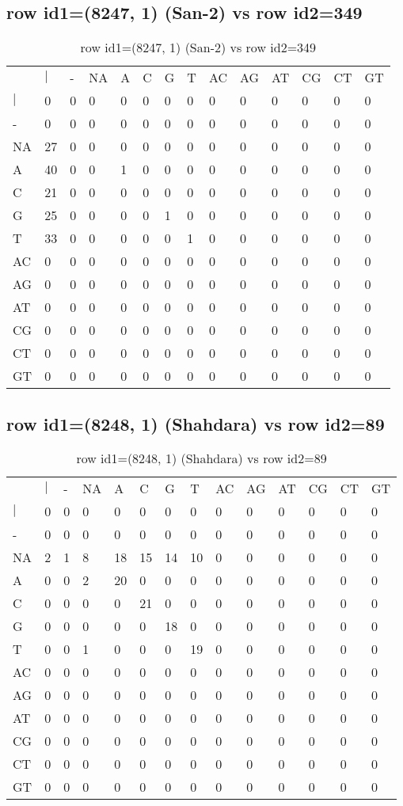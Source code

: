 \subsection{row id1=(8247, 1) (San-2) vs row id2=349}
\begin{center}
\begin{longtable}{|l|l|l|l|l|l|l|l|l|l|l|l|l|l|}
\caption{row id1=(8247, 1) (San-2) vs row id2=349} \label{table_dm190}\\
\hline
\\
\hline
&$|$&-&NA&A&C&G&T&AC&AG&AT&CG&CT&GT\\
$|$&0&0&0&0&0&0&0&0&0&0&0&0&0\\
-&0&0&0&0&0&0&0&0&0&0&0&0&0\\
NA&27&0&0&0&0&0&0&0&0&0&0&0&0\\
A&40&0&0&1&0&0&0&0&0&0&0&0&0\\
C&21&0&0&0&0&0&0&0&0&0&0&0&0\\
G&25&0&0&0&0&1&0&0&0&0&0&0&0\\
T&33&0&0&0&0&0&1&0&0&0&0&0&0\\
AC&0&0&0&0&0&0&0&0&0&0&0&0&0\\
AG&0&0&0&0&0&0&0&0&0&0&0&0&0\\
AT&0&0&0&0&0&0&0&0&0&0&0&0&0\\
CG&0&0&0&0&0&0&0&0&0&0&0&0&0\\
CT&0&0&0&0&0&0&0&0&0&0&0&0&0\\
GT&0&0&0&0&0&0&0&0&0&0&0&0&0\\
\hline
\end{longtable}
\end{center}

\subsection{row id1=(8248, 1) (Shahdara) vs row id2=89}
\begin{center}
\begin{longtable}{|l|l|l|l|l|l|l|l|l|l|l|l|l|l|}
\caption{row id1=(8248, 1) (Shahdara) vs row id2=89} \label{table_dm192}\\
\hline
\\
\hline
&$|$&-&NA&A&C&G&T&AC&AG&AT&CG&CT&GT\\
$|$&0&0&0&0&0&0&0&0&0&0&0&0&0\\
-&0&0&0&0&0&0&0&0&0&0&0&0&0\\
NA&2&1&8&18&15&14&10&0&0&0&0&0&0\\
A&0&0&2&20&0&0&0&0&0&0&0&0&0\\
C&0&0&0&0&21&0&0&0&0&0&0&0&0\\
G&0&0&0&0&0&18&0&0&0&0&0&0&0\\
T&0&0&1&0&0&0&19&0&0&0&0&0&0\\
AC&0&0&0&0&0&0&0&0&0&0&0&0&0\\
AG&0&0&0&0&0&0&0&0&0&0&0&0&0\\
AT&0&0&0&0&0&0&0&0&0&0&0&0&0\\
CG&0&0&0&0&0&0&0&0&0&0&0&0&0\\
CT&0&0&0&0&0&0&0&0&0&0&0&0&0\\
GT&0&0&0&0&0&0&0&0&0&0&0&0&0\\
\hline
\end{longtable}
\end{center}

